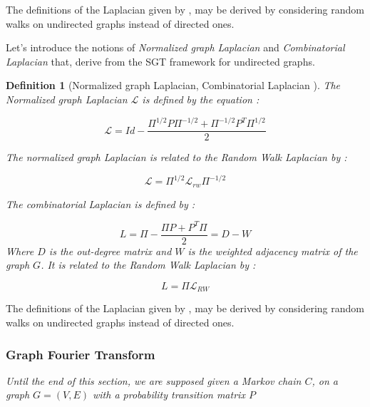 \documentclass[sn-mathphys]{sn-jnl}%
\theoremstyle{thmstyleone}%
\theoremstyle{thmstyletwo}%
\theoremstyle{thmstylethree}%
\newtheorem{definition}[theo]{Definition}
\begin{document}
The definitions of the Laplacian given by
\cite{shuman_narang_frossard_ortega_vandergheynst_2013,
  ricaud_borgnat_tremblay_goncalves_vandergheynst_2019,grinstead_snell_2006},
may be derived by considering random walks on undirected graphs
instead of directed ones.

Let's introduce the notions of \textit{Normalized graph Laplacian} and
\textit{Combinatorial Laplacian} that, derive from the SGT framework
for undirected graphs.

\begin{definition}[Normalized graph Laplacian, Combinatorial Laplacian \cite{sevi2019}]
  The Normalized graph Laplacian $\mathcal{L}$ is defined by the
  equation :

\begin{equation}
    \mathcal{L} = Id - \frac{\Pi^{1/2}P\Pi^{-1/2} + \Pi^{-1/2}P^T\Pi^{1/2}}{2}
\end{equation}

The normalized graph Laplacian is related to the Random Walk Laplacian
by :

\begin{equation}
    \mathcal{L} = \Pi^{1/2}\mathcal{L}_{rw}\Pi^{-1/2}
\end{equation}

The combinatorial Laplacian is defined by :

\begin{equation}
    L = \Pi - \frac{\Pi P + P^T \Pi}{2} = D-W
\end{equation}
Where $D$ is the out-degree matrix and $W$ is the weighted adjacency matrix of the graph $G$.
It is related to the Random Walk Laplacian by :

\begin{equation}
    L = \Pi \mathcal{L}_{RW}
\end{equation}

\end{definition}

The definitions of the Laplacian given by
\cite{shuman_narang_frossard_ortega_vandergheynst_2013,
  ricaud_borgnat_tremblay_goncalves_vandergheynst_2019,grinstead_snell_2006},
may be derived by considering random walks on undirected graphs
instead of directed ones.


\subsubsection{Graph Fourier Transform}
\textit{Until the end of this section, we are supposed given a Markov
  chain $C$, on a graph $G=(V,E)$ with a probability transition matrix
  $P$}
\end{document}
